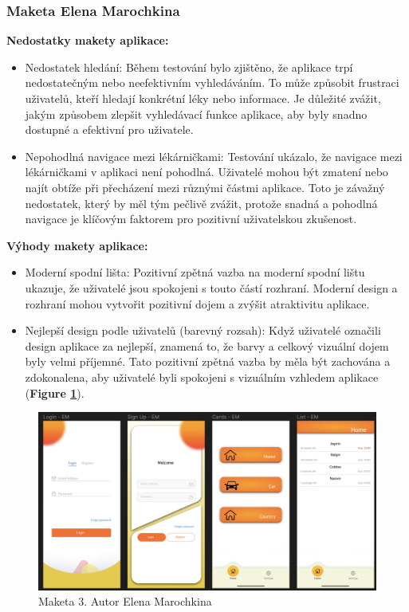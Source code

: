 \documentclass[a4paper, 11pt]{article}
\begin{document}
   \subsubsection{Maketa Elena Marochkina }
\noindent \textbf{Nedostatky makety aplikace:}
   \begin{itemize}
       \item Nedostatek hledání: Během testování bylo zjištěno, že aplikace trpí nedostatečným nebo neefektivním vyhledáváním. To může způsobit frustraci uživatelů, kteří hledají konkrétní léky nebo informace. Je důležité zvážit, jakým způsobem zlepšit vyhledávací funkce aplikace, aby byly snadno dostupné a efektivní pro uživatele.
       \item Nepohodlná navigace mezi lékárničkami: Testování ukázalo, že navigace mezi lékárničkami v aplikaci není pohodlná. Uživatelé mohou být zmatení nebo najít obtíže při přecházení mezi různými částmi aplikace. Toto je závažný nedostatek, který by měl tým pečlivě zvážit, protože snadná a pohodlná navigace je klíčovým faktorem pro pozitivní uživatelskou zkušenost.
   \end{itemize}
   \textbf{Výhody  makety aplikace:}
   \begin{itemize}
       \item Moderní spodní lišta: Pozitivní zpětná vazba na moderní spodní lištu ukazuje, že uživatelé jsou spokojeni s touto částí rozhraní. Moderní design a rozhraní mohou vytvořit pozitivní dojem a zvýšit atraktivitu aplikace.
       \item Nejlepší design podle uživatelů (barevný rozsah): Když uživatelé označili design aplikace za nejlepší, znamená to, že barvy a celkový vizuální dojem byly velmi příjemné. Tato pozitivní zpětná vazba by měla být zachována a zdokonalena, aby uživatelé byli spokojeni s vizuálním vzhledem aplikace (\textbf {Figure \ref{figure:maketa3}}).
   \end{itemize}
   \begin{figure}[!ht]
		\centering	\includegraphics[width=\textwidth,height=\textheight,keepaspectratio]{Maketa_EM.png}
		\caption{Maketa 3. Autor Elena Marochkina}
		\label{figure:maketa3}
	\end{figure}
\end{document}
